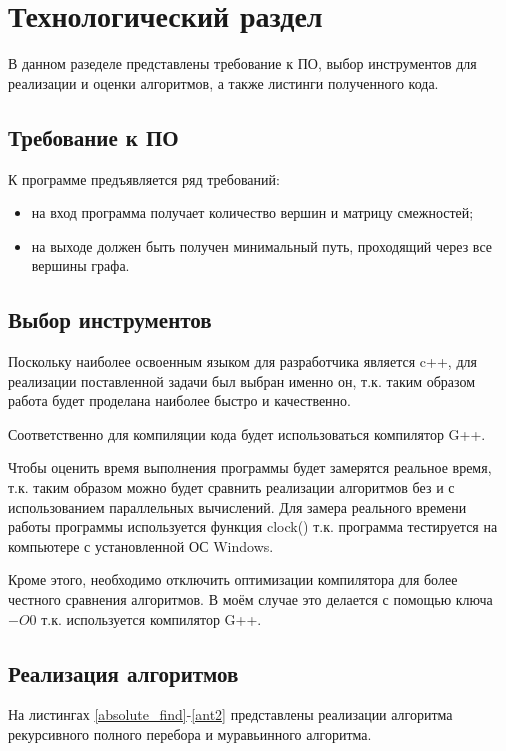 \chapter{Технологический раздел}
В данном разеделе представлены требование к ПО, выбор инструментов для реализации и оценки алгоритмов, а также листинги полученного кода.

\section{Требование к ПО}

К программе предъявляется ряд требований:

\begin{itemize}
	\item на вход программа получает количество вершин и матрицу смежностей;
	\item на выходе должен быть получен минимальный путь, проходящий через все вершины графа.
\end{itemize}

\section{Выбор инструментов}
Поскольку наиболее освоенным языком для разработчика является c++, для реализации поставленной задачи был выбран именно он, т.к. таким образом работа будет проделана наиболее быстро и качественно.

Соответственно для компиляции кода будет использоваться компилятор G++.

Чтобы оценить время выполнения программы будет замерятся реальное время, т.к. таким образом можно будет сравнить реализации алгоритмов без и с использованием параллельных вычислений. Для замера реального времени работы программы используется функция clock() т.к. программа тестируется на компьютере с установленной ОС Windows. \cite{clock()}

Кроме этого, необходимо отключить оптимизации компилятора для более честного сравнения алгоритмов. В моём случае это делается с помощью ключа $-O0$ т.к. используется компилятор G++. \cite{gcc_optimization}

\section{Реализация алгоритмов}
На листингах \ref{absolute_find}-\ref{ant2} представлены реализации алгоритма рекурсивного полного перебора и муравьинного алгоритма.

